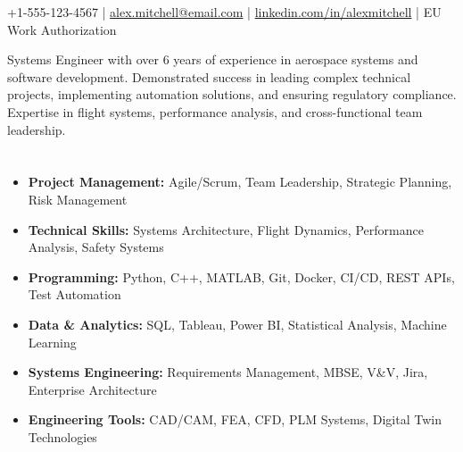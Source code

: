 \documentclass[9pt]{article}        %
\begin{document}
\centerline{%
  \selectfont\textbf{%
    {\fontsize{20.74}{25}\selectfont{}}%
    {\fontsize{14.4}{18}\selectfont{}}%
    \hspace{0.5em}%
    {\fontsize{20.74}{25}\selectfont{}}%
    {\fontsize{14.4}{18}\selectfont{}}%
  }%
}
\vspace{+2pt}

\centerline{ +1-555-123-4567 | \href{mailto:alex.mitchell@email.com}{alex.mitchell@email.com} | \href{https://www.linkedin.com/in/alexmitchell}{linkedin.com/in/alexmitchell} | EU Work Authorization }

\vspace{+12pt}

Systems Engineer with over 6 years of experience in aerospace systems and software development. Demonstrated success in leading complex technical projects, implementing automation solutions, and ensuring regulatory compliance. Expertise in flight systems, performance analysis, and cross-functional team leadership.

\section*{{\fontsize{12}{14.4}\selectfont{}}{\fontsize{9}{10.8}\selectfont{}}}
\begin{itemize}
\item \textbf{Project Management:} Agile/Scrum, Team Leadership, Strategic Planning, Risk Management
\item \textbf{Technical Skills:} Systems Architecture, Flight Dynamics, Performance Analysis, Safety Systems
\item \textbf{Programming:} Python, C++, MATLAB, Git, Docker, CI/CD, REST APIs, Test Automation
\item \textbf{Data \& Analytics:} SQL, Tableau, Power BI, Statistical Analysis, Machine Learning
\item \textbf{Systems Engineering:} Requirements Management, MBSE, V\&V, Jira, Enterprise Architecture
\item \textbf{Engineering Tools:} CAD/CAM, FEA, CFD, PLM Systems, Digital Twin Technologies
\end{itemize}
\end{document}
